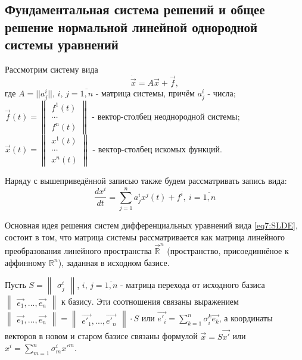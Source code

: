 \subsection{Фундаментальная система решений и общее решение нормальной линейной однородной
системы уравнений}

Рассмотрим систему вида 
\begin{equation}
    \label{eq7:SLDE}
    \dot{\vec{x}} = A \vec{x} + \vec{f},
\end{equation} 
где $A = || a^i_j||$, $i,\,j = \overline{1, n}$ - матрица системы, 
причём $a^i_j$ - числа; 
$ \vec{f}(t) = 
  \begin{Vmatrix}
    f^1(t) \\
    \cdots    \\
    f^n(t)
  \end{Vmatrix}$ - вектор-столбец неоднородной системы;
$\vec{x}(t) = 
\begin{Vmatrix}
  x^1(t) \\
  \cdots    \\
  x^n(t)
\end{Vmatrix}$ - вектор-столбец искомых функций.  


Наряду с вышеприведённой записью также будем рассматривать запись вида: 
$$\frac{dx^i}{dt} = \sum\limits^n_{j=1}a^i_j x^j(t) + f^i, ~i = \overline{1, n}$$

Основная идея решения систем дифференциальных уравнений вида \eqref{eq7:SLDE}, 
состоит в том, что матрица системы рассматривается как матрица линейного преобразования 
линейного пространства $\vec{\mathbb{R}}^n$ (пространство, присоединнёное к аффинному 
$\mathbb{R}^n$), заданная в исходном базисе. 

Пусть $S = \begin{Vmatrix} \sigma_j^i \end{Vmatrix}$, $i,\,j = \overline{1, n}$ - матрица перехода от исходного базиса $\begin{Vmatrix} \vec{e_1}, ..., \vec{e_n} \end{Vmatrix}$ к базису. 
Эти соотношения связаны выражением $\begin{Vmatrix} \vec{e_1}, ..., \vec{e_n} \end{Vmatrix} = \begin{Vmatrix} \vec{e'_1}, ..., \vec{e'_n} \end{Vmatrix} \cdot S $ 
или $\vec{e'_i} = \sum\limits_{k = 1}^n \sigma_i^k \vec{e_k}$, а координаты векторов в новом и старом базисе связаны формулой $\vec{x} = S \vec{x'}$ или $x^i = \sum\limits_{m = 1}^n \sigma_m^i {x'}^m$.


